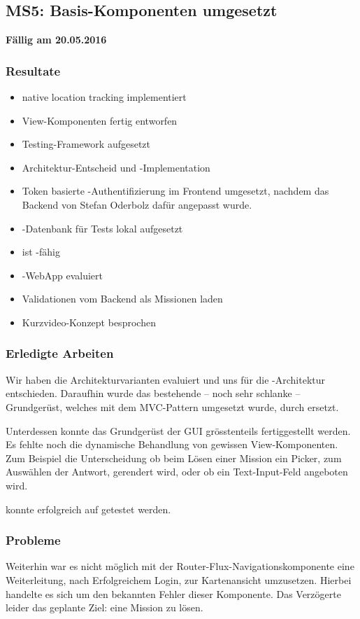 \subsection{MS5: Basis-Komponenten umgesetzt}
\label{pm-ms5}
\textbf{Fällig am 20.05.2016}
\subsubsection{Resultate}
\begin{itemize}
	\item native location tracking implementiert
	\item View-Komponenten fertig entworfen
	\item Testing-\gls{Framework} aufgesetzt
	\item Architektur-Entscheid und -Implementation
	\item Token basierte -Authentifizierung im Frontend umgesetzt, nachdem das Backend von Stefan Oderbolz dafür angepasst wurde.
	\item \kort{}-Datenbank für Tests lokal aufgesetzt
	\item \kort{} ist -fähig
	\item {}-\gls{WebApp} evaluiert
	\item Validationen vom Backend als Missionen laden
	\item Kurzvideo-Konzept besprochen
\end{itemize}

\subsubsection{Erledigte Arbeiten}

Wir haben die Architekturvarianten evaluiert und uns für die -Architektur entschieden.
Daraufhin wurde das bestehende -- noch sehr schlanke -- Grundgerüst, welches mit dem MVC-Pattern umgesetzt wurde, durch  ersetzt.

Unterdessen konnte das Grundgerüst der \gls{GUI} grösstenteils fertiggestellt werden. 
Es fehlte noch die dynamische Behandlung von gewissen View-Komponenten.
Zum Beispiel die Unterscheidung ob beim Lösen einer Mission ein Picker, zum Auswählen der Antwort, gerendert wird, oder ob ein Text-Input-Feld angeboten wird.

\kort{} konnte erfolgreich auf  getestet werden. 

\subsubsection{Probleme}
Weiterhin war es nicht möglich mit der Router-Flux-Navigationskomponente eine Weiterleitung, nach Erfolgreichem Login, zur Kartenansicht umzusetzen.
Hierbei handelte es sich um den bekannten Fehler dieser Komponente.
Das Verzögerte leider das geplante Ziel: eine Mission zu lösen.

